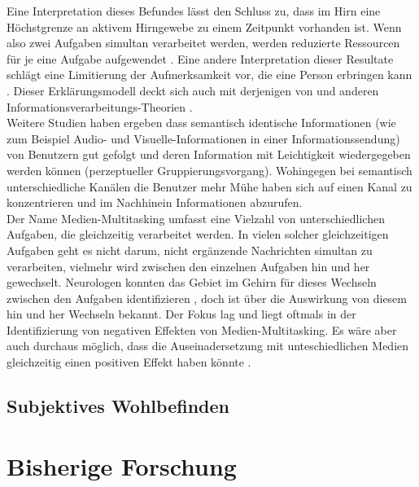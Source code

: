 Eine Interpretation dieses Befundes lässt den Schluss zu, dass im Hirn eine Höchstgrenze an aktivem Hirngewebe zu einem Zeitpunkt vorhanden ist. Wenn also zwei Aufgaben simultan verarbeitet werden, werden reduzierte Ressourcen für je eine Aufgabe aufgewendet \cite{Just2001}. Eine andere Interpretation dieser Resultate schlägt eine Limitierung der Aufmerksamkeit vor, die eine Person erbringen kann \cite{Just2001}. Dieser Erklärungsmodell deckt sich auch mit derjenigen von  und anderen Informationsverarbeitungs-Theorien \cite{Kieras1997}.\\
Weitere Studien haben ergeben \cite{Grimes1990, Grimes1991} dass semantisch identische Informationen (wie zum Beispiel Audio- und Visuelle-Informationen in einer Informationssendung) von Benutzern gut gefolgt und deren Information mit Leichtigkeit wiedergegeben werden können (perzeptueller Gruppierungsvorgang). Wohingegen bei semantisch unterschiedliche Kanälen die Benutzer mehr Mühe haben sich auf einen Kanal zu konzentrieren und im Nachhinein Informationen abzurufen. \\
Der Name Medien-Multitasking umfasst eine Vielzahl von unterschiedlichen Aufgaben, die gleichzeitig verarbeitet werden. In vielen solcher gleichzeitigen Aufgaben geht es nicht darum, nicht ergänzende Nachrichten simultan zu verarbeiten, vielmehr wird zwischen den einzelnen Aufgaben hin und her gewechselt. Neurologen konnten das Gebiet im Gehirn für dieses Wechseln zwischen den Aufgaben identifizieren \cite{Wallis2006, Wood2003}, doch ist über die Auswirkung von diesem hin und her Wechseln bekannt. Der Fokus lag und liegt oftmals in der Identifizierung von negativen Effekten von Medien-Multitasking. Es wäre aber auch durchaus möglich, dass die Auseinadersetzung mit unteschiedlichen Medien gleichzeitig einen positiven Effekt haben könnte \cite{Foehr2006}.   

\subsection{Subjektives Wohlbefinden}\label{subsection.subjektivesWohlbefinden}


\section{Bisherige Forschung}\label{section.bisherigeForschung}



